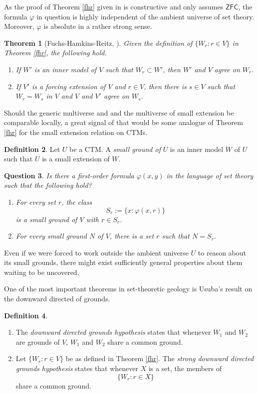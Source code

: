 \documentclass[12pt, twoside]{memoir}
\numberwithin{equation}{section}
\newtheorem{thm}{Theorem}[section]
\newtheorem{ques}[thm]{Question}
\theoremstyle{definition}
\newtheorem{defi}[thm]{Definition}
\theoremstyle{remark}
\theoremstyle{definition}
\theoremstyle{definition}
\theoremstyle{definition}
\theoremstyle{remark}
\begin{document}
As the proof of Theorem \ref{fhr} given in \cite{fuchs} is constructive and only assumes $\mathsf{ZFC}$, the formula $\varphi$ in question is highly independent of the ambient universe of set theory. Moreover, $\varphi$ is absolute in a rather strong sense.

\begin{thm}[Fuchs-Hamkins-Reitz, \cite{fuchs}]\label{fhr2}
Given the definition of $\{W_r : r \in V\}$ in Theorem \ref{fhr}, the following hold.
\begin{enumerate}[label=(\arabic*)]
    \item If $W'$ is an inner model of $V$ such that $W_r \subset W'$, then $W'$ and $V$ agree on $W_r$.
    \item If $V'$ is a forcing extension of $V$ and $r \in V$, then there is $s \in V$ such that $W_r = W_s$ in $V$ and $V$ and $V'$ agree on $W_s$.
\end{enumerate}
\end{thm}

Should the generic multiverse and and the multiverse of small extension be comparable locally, a great signal of that would be some analogue of Theorem \ref{fhr} for the small extension relation on CTMs.

\begin{defi}
Let $U$ be a CTM. A \emph{small ground of} $U$ is an inner model $W$ of $U$ such that $U$ is a small extension of $W$.
\end{defi}

\begin{ques}
Is there a first-order formula $\varphi(x, y)$ in the language of set theory such that the following hold?
\begin{enumerate}[label=(\arabic*)]
    \item For every set $r$, the class $$S_r := \{x : \varphi(x, r)\}$$ is a small ground of $V$ with $r \in S_r$.
    \item For every small ground $N$ of $V$, there is a set $r$ such that $N = S_r$.
\end{enumerate}
\end{ques}

Even if we were forced to work outside the ambient universe $U$ to reason about its small grounds, there might exist sufficiently general properties about them waiting to be uncovered.

One of the most important theorems in set-theoretic geology is Usuba's result on the downward directed of grounds.

\begin{defi}
\leavevmode
\begin{enumerate}[label=(\arabic*)]
    \item The \emph{downward directed grounds hypothesis} states that whenever $W_1$ and $W_2$ are grounds of $V$, $W_1$ and $W_2$ share a common ground.
    \item Let $\{W_r : r \in V\}$ be as defined in Theorem \ref{fhr}. The \emph{strong downward directed grounds hypothesis} states that whenever $X$ is a set, the members of $$\{W_r : r \in X\}$$ share a common ground.
\end{enumerate}
\end{defi}
\end{document}

